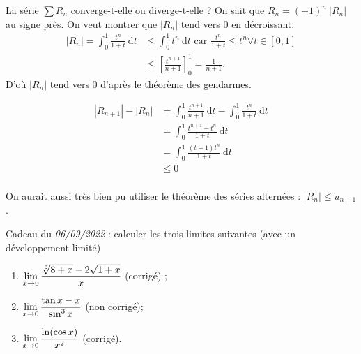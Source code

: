 \begin{exo}
\begin{enumerate}
			La série $\sum R_n$\/ converge-t-elle ou diverge-t-elle ?
			On sait que $R_n = (-1)^n\:|R_n|$\/ au signe près.
			On veut montrer que $|R_n|$\/ tend vers 0 en décroissant.
			\begin{align*}
				|R_n| = \int_{0}^{1} \frac{t^n}{1+t}~\mathrm{d}t &\le \int_{0}^{1} t^n~\mathrm{d}t \text{ car } \frac{t^n}{1 + t} \le t^n \forall t \in [0,1]\\
				&\le \left[ \frac{t^{n+1}}{n+1} \right]_0^1 = \frac{1}{n+1}.
			\end{align*}
			D'où $|R_n|$\/ tend vers 0 d'après le théorème des gendarmes.

			\begin{align*}
				|R_{n+1}| - |R_n| &= \int_{0}^{1} \frac{t^{n+1}}{n+1}~\mathrm{d}t - \int_{0}^{1} \frac{t^n}{1 + t}~\mathrm{d}t\\
				&= \int_{0}^{1} \frac{t^{n+1} - t^n}{1+t}~\mathrm{d}t \\
				&= \int_{0}^{1} \frac{(t-1)t^n}{1 + t}~\mathrm{d}t \\
				&\le 0 \\
			\end{align*}

			On aurait aussi très bien pu utiliser le théorème des séries alternées : $|R_n| \le u_{n+1}$.
	\end{enumerate}
\end{exo}

Cadeau du {\it 06/09/2022}\/ : 
calculer les trois limites suivantes (avec un développement limité)
\begin{enumerate}
	\item $\displaystyle \lim_{x\to 0} \frac{\sqrt[3]{8+x} - 2\sqrt{1+x}}{x}$\/ (corrigé) ;
	\item $\displaystyle \lim_{x\to 0} \frac{\tan x - x}{\sin^3 x}$\/ (non corrigé);
	\item $\displaystyle \lim_{x\to 0} \frac{\ln (\cos x)}{x^2}$\/ (corrigé).
\end{enumerate}

\bigskip

\begin{comment}
\begin{enumerate}
	\item[3.]
		\[
			\frac{\ln(\cos x)}{x^2} = \frac{\ln\left( 1 - \frac{x^2}{2} + \po(x^2)\right)}{x^2} = \frac{-\frac{x^2}{2} + \po(x^2)}{x^2} = -\frac{1}{2} + \po(1) \tendsto{n\to +\infty} -\frac{1}{2}
		.\] 
	\item[1.]
		\[
			\frac{\sqrt[3]{8+x} - 2\sqrt{1+x}}{x} = \frac{\sqrt[3]{8} \sqrt[3]{1+\frac{x}{8}} - 2\sqrt{1+x}}{x} = \frac{2\left( 1+ \frac{1}{3}\frac{x}{8} \right) - 2\left( 1+ \frac{1}{2}x \right)}{x}
		.\] 
\end{enumerate}
\end{comment}



